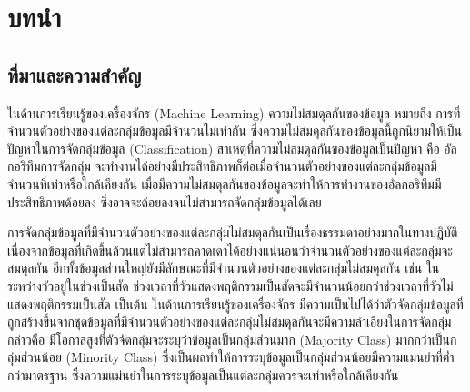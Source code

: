 \chapter{บทนำ}
\label{chapter:introduction}

\section{ที่มาและความสำคัญ}
ในด้านการเรียนรู้ของเครื่องจักร (Machine Learning) ความไม่สมดุลกันของข้อมูล หมายถึง การที่จำนวนตัวอย่างของแต่ละกลุ่มข้อมูลมีจำนวนไม่เท่ากัน 
ซึ่งความไม่สมดุลกันของข้อมูลนี้ถูกนิยามให้เป็นปัญหาในการจัดกลุ่มข้อมูล (Classification) สาเหตุที่ความไม่สมดุลกันของข้อมูลเป็นปัญหา คือ อัลกอริทึมการจัดกลุ่ม จะทำงานได้อย่างมีประสิทธิภาพก็ต่อเมื่อจำนวนตัวอย่างของแต่ละกลุ่มข้อมูลมีจำนวนที่เท่าหรือใกล้เคียงกัน 
เมื่อมีความไม่สมดุลกันของข้อมูลจะทำให้การทำงานของอัลกอริทึมมีประสิทธิภาพด้อยลง ซึ่งอาจจะด้อยลงจนไม่สามารถจัดกลุ่มข้อมูลได้เลย

การจัดกลุ่มข้อมูลที่มีจำนวนตัวอย่างของแต่ละกลุ่มไม่สมดุลกันเป็นเรื่องธรรมดาอย่างมากในทางปฏิบัติ 
เนื่องจากข้อมูลที่เกิดขึ้นล้วนแต่ไม่สามารถคาดเดาได้อย่างแน่นอนว่าจำนวนตัวอย่างของแต่ละกลุ่มจะสมดุลกัน อีกทั้งข้อมูลส่วนใหญ่ยังมีลักษณะที่มีจำนวนตัวอย่างของแต่ละกลุ่มไม่สมดุลกัน 
เช่น ในระหว่างวัวอยู่ในช่วงเป็นสัด ช่วงเวลาที่วัวแสดงพฤติกรรมเป็นสัดจะมีจำนวนน้อยกว่าช่วงเวลาที่วัวไม่แสดงพฤติกรรมเป็นสัด เป็นต้น ในด้านการเรียนรู้ของเครื่องจักร 
มีความเป็นไปได้ว่าตัวจัดกลุ่มข้อมูลที่ถูกสร้างขึ้นจากชุดข้อมูลที่มีจำนวนตัวอย่างของแต่ละกลุ่มไม่สมดุลกันจะมีความลำเอียงในการจัดกลุ่ม กล่าวคือ 
มีโอกาสสูงที่ตัวจัดกลุ่มจะระบุว่าข้อมูลเป็นกลุ่มส่วนมาก (Majority Class) มากกว่าเป็นกลุ่มส่วนน้อย (Minority Class) 
ซึ่งเป็นผลทำให้การระบุข้อมูลเป็นกลุ่มส่วนน้อยมีความแม่นยำที่ต่ำกว่ามาตรฐาน ซึ่งความแม่นยำในการระบุข้อมูลเป็นแต่ละกลุ่มควรจะเท่าหรือใกล้เคียงกัน

